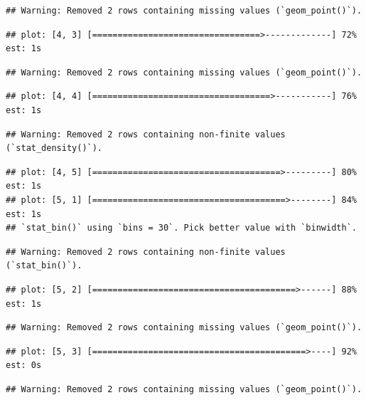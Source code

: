 \documentclass[
]{article}
\begin{document}
\begin{verbatim}
## Warning: Removed 2 rows containing missing values (`geom_point()`).
\end{verbatim}

\begin{verbatim}
## plot: [4, 3] [=================================>-------------] 72% est: 1s
\end{verbatim}

\begin{verbatim}
## Warning: Removed 2 rows containing missing values (`geom_point()`).
\end{verbatim}

\begin{verbatim}
## plot: [4, 4] [===================================>-----------] 76% est: 1s
\end{verbatim}

\begin{verbatim}
## Warning: Removed 2 rows containing non-finite values (`stat_density()`).
\end{verbatim}

\begin{verbatim}
## plot: [4, 5] [=====================================>---------] 80% est: 1s
## plot: [5, 1] [======================================>--------] 84% est: 1s
## `stat_bin()` using `bins = 30`. Pick better value with `binwidth`.
\end{verbatim}

\begin{verbatim}
## Warning: Removed 2 rows containing non-finite values (`stat_bin()`).
\end{verbatim}

\begin{verbatim}
## plot: [5, 2] [========================================>------] 88% est: 1s
\end{verbatim}

\begin{verbatim}
## Warning: Removed 2 rows containing missing values (`geom_point()`).
\end{verbatim}

\begin{verbatim}
## plot: [5, 3] [==========================================>----] 92% est: 0s
\end{verbatim}

\begin{verbatim}
## Warning: Removed 2 rows containing missing values (`geom_point()`).
\end{verbatim}
\end{document}

